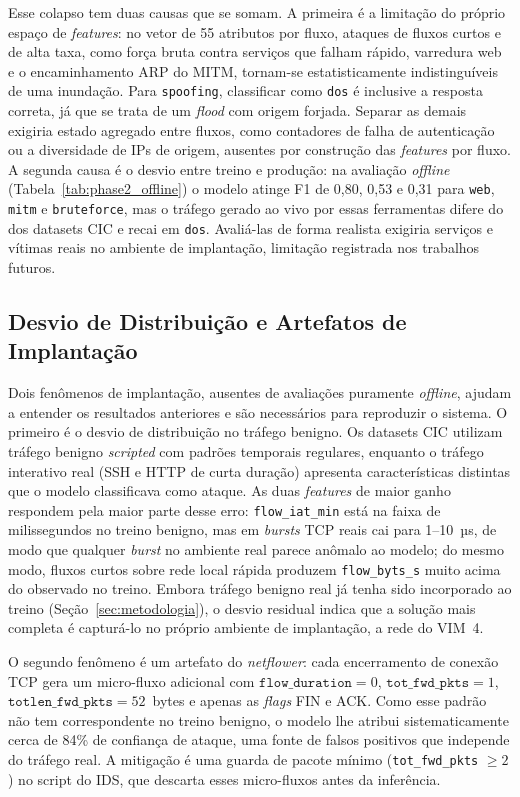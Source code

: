\documentclass[12pt]{article}
\begin{document}
Esse colapso tem duas causas que se somam. A primeira é a limitação do próprio
espaço de \textit{features}: no vetor de 55 atributos por fluxo, ataques de
fluxos curtos e de alta taxa, como força bruta contra serviços que falham
rápido, varredura web e o encaminhamento ARP do MITM, tornam-se estatisticamente
indistinguíveis de uma inundação. Para \texttt{spoofing}, classificar como
\texttt{dos} é inclusive a resposta correta, já que se trata de um \textit{flood}
com origem forjada. Separar as demais exigiria estado agregado entre fluxos, como
contadores de falha de autenticação ou a diversidade de IPs de origem, ausentes
por construção das \textit{features} por fluxo. A segunda causa é o desvio entre
treino e produção: na avaliação \textit{offline}
(Tabela~\ref{tab:phase2_offline}) o modelo atinge F1 de 0,80, 0,53 e 0,31 para
\texttt{web}, \texttt{mitm} e \texttt{bruteforce}, mas o tráfego gerado ao vivo
por essas ferramentas difere do dos datasets CIC e recai em \texttt{dos}.
Avaliá-las de forma realista exigiria serviços e vítimas reais no ambiente de
implantação, limitação registrada nos trabalhos futuros.

\subsection{Desvio de Distribuição e Artefatos de Implantação}
\label{subsec:res_artefatos}

Dois fenômenos de implantação, ausentes de avaliações puramente \textit{offline},
ajudam a entender os resultados anteriores e são necessários para reproduzir o
sistema. O primeiro é o desvio de distribuição no tráfego benigno. Os datasets
CIC utilizam tráfego benigno \textit{scripted} com padrões temporais regulares,
enquanto o tráfego interativo real (SSH e HTTP de curta duração) apresenta
características distintas que o modelo classificava como ataque. As duas
\textit{features} de maior ganho respondem pela maior parte desse erro:
\texttt{flow\_iat\_min} está na faixa de milissegundos no treino benigno, mas em
\textit{bursts} TCP reais cai para 1--10~µs, de modo que qualquer \textit{burst}
no ambiente real parece anômalo ao modelo; do mesmo modo, fluxos curtos sobre
rede local rápida produzem \texttt{flow\_byts\_s} muito acima do observado no
treino. Embora tráfego benigno real já tenha sido incorporado ao treino
(Seção~\ref{sec:metodologia}), o desvio residual indica que a solução mais
completa é capturá-lo no próprio ambiente de implantação, a rede do VIM~4.

O segundo fenômeno é um artefato do \textit{netflower}: cada encerramento de
conexão TCP gera um micro-fluxo adicional com $\texttt{flow\_duration} = 0$,
$\texttt{tot\_fwd\_pkts} = 1$, $\texttt{totlen\_fwd\_pkts} = 52$~bytes e apenas
as \textit{flags} FIN e ACK. Como esse padrão não tem correspondente no treino
benigno, o modelo lhe atribui sistematicamente cerca de 84\% de confiança de
ataque, uma fonte de falsos positivos que independe do tráfego real. A mitigação
é uma guarda de pacote mínimo (\texttt{tot\_fwd\_pkts} $\geq 2$) no script do
IDS, que descarta esses micro-fluxos antes da inferência.
\end{document}
